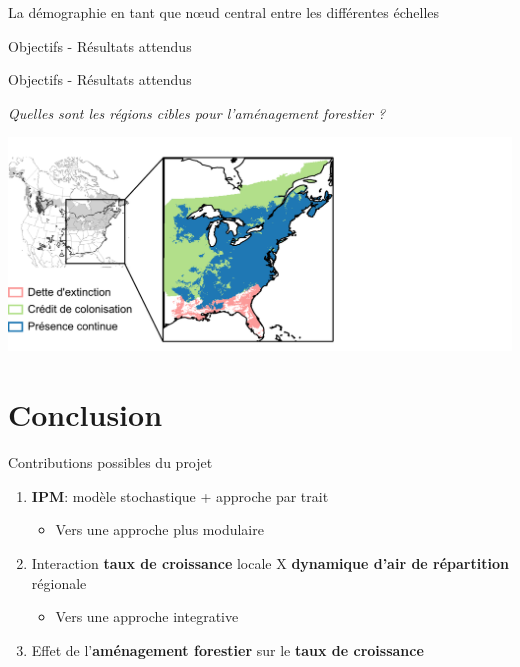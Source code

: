 \documentclass[11pt, compress, aspectratio=1610]{beamer}
\providecommand{\tightlist}{%
  \setlength{\itemsep}{0pt}\setlength{\parskip}{0pt}}
\begin{document}
\begin{frame}{La démographie en tant que nœud central entre les
différentes échelles}
\begin{frame}{Objectifs - Résultats attendus}
\par

\end{frame}

\begin{frame}{Objectifs - Résultats attendus}
\protect\hypertarget{objectifs---ruxe9sultats-attendus-5}{}

\centering

\emph{Quelles sont les régions cibles pour l’aménagement forestier ?}

\centering

\includegraphics[scale=0.4]{figures/Talluto0.png}\hspace*{-4cm}

\par

\end{frame}

\hypertarget{conclusion}{%
\section{Conclusion}\label{conclusion}}

\begin{frame}{Contributions possibles du projet}
\protect\hypertarget{contributions-possibles-du-projet}{}

\begin{enumerate}
[1.]
\tightlist
\item
  \textbf{IPM}: modèle stochastique + approche par trait

  \begin{itemize}
  \tightlist
  \item
    Vers une approche plus modulaire
  \end{itemize}
\item
  Interaction \textbf{taux de croissance} locale X \textbf{dynamique
  d’air de répartition} régionale

  \begin{itemize}
  \tightlist
  \item
    Vers une approche integrative
  \end{itemize}
\item
  Effet de l’\textbf{aménagement forestier} sur le \textbf{taux de
  croissance}
\end{enumerate}


\end{frame}
\end{frame}
\end{document}
